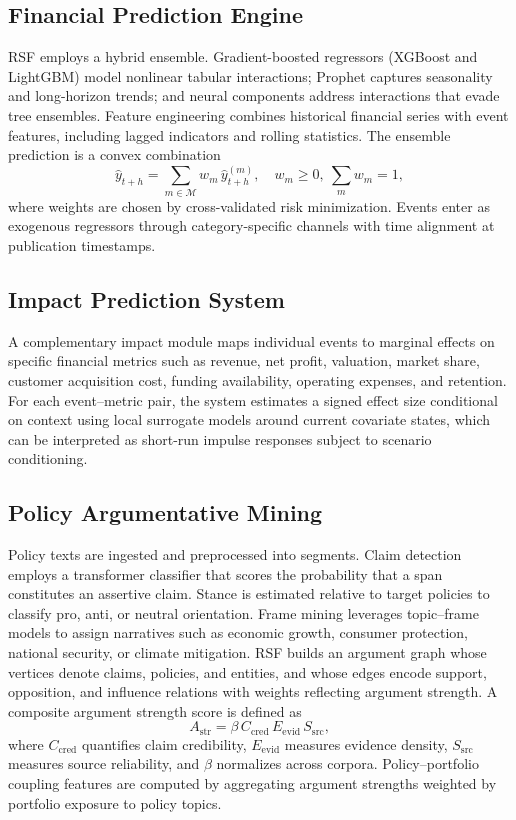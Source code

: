\documentclass[conference]{IEEEtran}
\begin{document}
\subsection{Financial Prediction Engine}
RSF employs a hybrid ensemble. Gradient-boosted regressors (XGBoost and LightGBM) model nonlinear tabular interactions; Prophet captures seasonality and long-horizon trends; and neural components address interactions that evade tree ensembles. Feature engineering combines historical financial series with event features, including lagged indicators and rolling statistics. The ensemble prediction is a convex combination
\begin{equation}
\hat{y}_{t+h} = \sum_{m\in\mathcal{M}} w_m \, \hat{y}^{(m)}_{t+h},\quad w_m\ge 0,\ \sum_m w_m=1,
\end{equation}
where weights are chosen by cross-validated risk minimization. Events enter as exogenous regressors through category-specific channels with time alignment at publication timestamps.

\subsection{Impact Prediction System}
A complementary impact module maps individual events to marginal effects on specific financial metrics such as revenue, net profit, valuation, market share, customer acquisition cost, funding availability, operating expenses, and retention. For each event–metric pair, the system estimates a signed effect size conditional on context using local surrogate models around current covariate states, which can be interpreted as short-run impulse responses subject to scenario conditioning.

\subsection{Policy Argumentative Mining}
Policy texts are ingested and preprocessed into segments. Claim detection employs a transformer classifier that scores the probability that a span constitutes an assertive claim. Stance is estimated relative to target policies to classify pro, anti, or neutral orientation. Frame mining leverages topic–frame models to assign narratives such as economic growth, consumer protection, national security, or climate mitigation. RSF builds an argument graph whose vertices denote claims, policies, and entities, and whose edges encode support, opposition, and influence relations with weights reflecting argument strength. A composite argument strength score is defined as
\begin{equation}
A_{\mathrm{str}} = \beta\,C_{\mathrm{cred}}\,E_{\mathrm{evid}}\,S_{\mathrm{src}},
\end{equation}
where $C_{\mathrm{cred}}$ quantifies claim credibility, $E_{\mathrm{evid}}$ measures evidence density, $S_{\mathrm{src}}$ measures source reliability, and $\beta$ normalizes across corpora. Policy–portfolio coupling features are computed by aggregating argument strengths weighted by portfolio exposure to policy topics.
\end{document}
